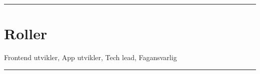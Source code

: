 \documentclass[a4paper,11pt]{article}
\begin{document}
\begin{paracol}{2}
\vspace{0.5em} 
\noindent\rule{\linewidth}{0.2pt}

\section{\ubuntu Roller}
Frontend utvikler, \hspace{0.1em}
App utvikler, \hspace{0.1em}
Tech lead, \hspace{0.1em}
Fagansvarlig

\end{paracol}

\vfill
\noindent\rule{\linewidth}{0.5pt}\\
\hfill 
\end{document}
